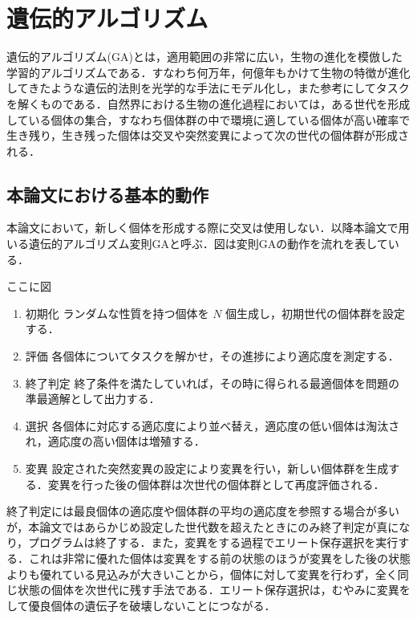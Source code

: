 \section{遺伝的アルゴリズム}
遺伝的アルゴリズム(GA)とは，適用範囲の非常に広い，生物の進化を模倣した学習的アルゴリズムである\cite{遺伝的アルゴリズム}．すなわち何万年，何億年もかけて生物の特徴が進化してきたような遺伝的法則を光学的な手法にモデル化し，また参考にしてタスクを解くものである．自然界における生物の進化過程においては，ある世代を形成している個体の集合，すなわち個体群の中で環境に適している個体が高い確率で生き残り，生き残った個体は交叉や突然変異によって次の世代の個体群が形成される．

\subsection{本論文における基本的動作}
本論文において，新しく個体を形成する際に交叉は使用しない．以降本論文で用いる遺伝的アルゴリズム変則GAと呼ぶ．図は変則GAの動作を流れを表している．

ここに図

\begin{enumerate}
    \item 初期化
    ランダムな性質を持つ個体を $ N $ 個生成し，初期世代の個体群を設定する．

    \item 評価
    各個体についてタスクを解かせ，その進捗により適応度を測定する．

    \item 終了判定
    終了条件を満たしていれば，その時に得られる最適個体を問題の準最適解として出力する．

    \item 選択
    各個体に対応する適応度により並べ替え，適応度の低い個体は淘汰され，適応度の高い個体は増殖する．

    \item 変異
    設定された突然変異の設定により変異を行い，新しい個体群を生成する．変異を行った後の個体群は次世代の個体群として再度評価される．
\end{enumerate}

終了判定には最良個体の適応度や個体群の平均の適応度を参照する場合が多いが，本論文ではあらかじめ設定した世代数を超えたときにのみ終了判定が真になり，プログラムは終了する．また，変異をする過程でエリート保存選択を実行する．これは非常に優れた個体は変異をする前の状態のほうが変異をした後の状態よりも優れている見込みが大きいことから，個体に対して変異を行わず，全く同じ状態の個体を次世代に残す手法である．エリート保存選択は，むやみに変異をして優良個体の遺伝子を破壊しないことにつながる．

